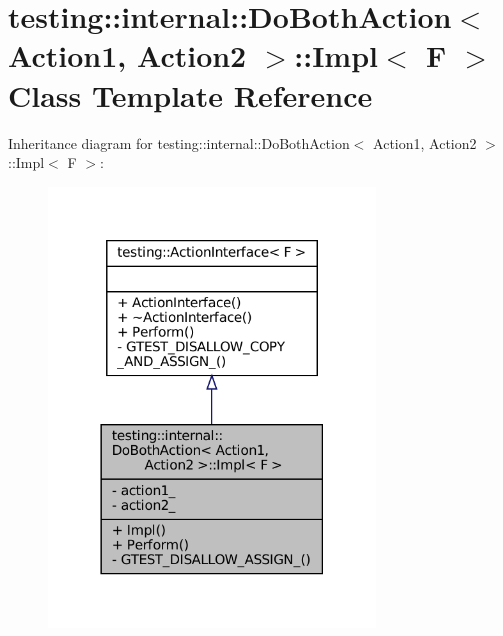 \hypertarget{classtesting_1_1internal_1_1DoBothAction_1_1Impl}{}\section{testing\+:\+:internal\+:\+:Do\+Both\+Action$<$ Action1, Action2 $>$\+:\+:Impl$<$ F $>$ Class Template Reference}
\label{classtesting_1_1internal_1_1DoBothAction_1_1Impl}


Inheritance diagram for testing\+:\+:internal\+:\+:Do\+Both\+Action$<$ Action1, Action2 $>$\+:\+:Impl$<$ F $>$\+:
\nopagebreak
\begin{figure}[H]
\begin{center}
\leavevmode
\includegraphics[width=246pt]{classtesting_1_1internal_1_1DoBothAction_1_1Impl__inherit__graph}
\end{center}
\end{figure}


